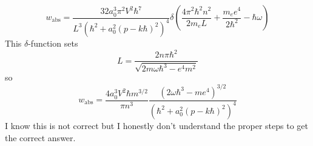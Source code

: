 \documentclass[a4paper,twoside]{article}
\begin{document}
\begin{problem}
    \begin{equation}
        w_{\text{abs}} = \frac{32 a_0^3 \pi^2 V^2 \hbar^7}{L^3 \left( \hbar^2 + a_0^2 (p - k \hbar)^2 \right)^4} \delta\left(\frac{4 \pi^2 \hbar^2 n^2}{2m_e L} + \frac{m_e e^4}{2 \hbar^2} - \hbar \omega\right)
    \end{equation}
    This $\delta$-function sets
    \begin{equation}
        L = \frac{2n \pi \hbar^2}{\sqrt{2m \omega \hbar^3 - e^4 m^2}}
    \end{equation}
    so
    \begin{equation}
        w_{\text{abs}} = \frac{4 a_0^3 V^2 \hbar m^{3/2}}{\pi n^3} \frac{\left( 2 \omega \hbar^3 - m e^4 \right)^{3/2}}{(\hbar^2 + a_0^2 (p-k \hbar)^2)^4}
    \end{equation}
    I know this is not correct but I honestly don't understand the proper steps to get the correct answer.
\end{problem}
\end{document}

